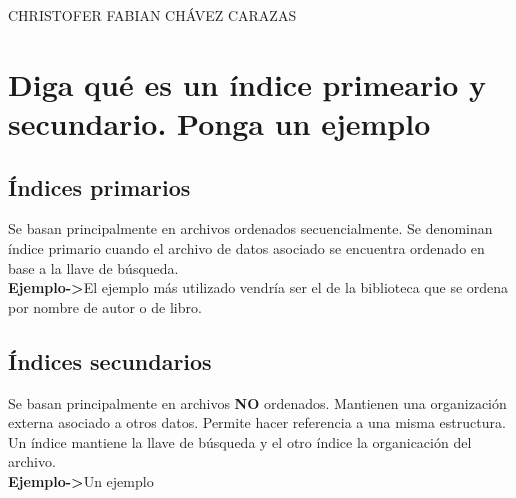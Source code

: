 \documentclass[a4paper,12pt]{article}
\begin{document}
\begin{LARGE}
 CHRISTOFER FABIAN CHÁVEZ CARAZAS
\end{LARGE}

\section{Diga qué es un índice primeario y secundario. Ponga un ejemplo}

  \subsection{Índices primarios}
  
    Se basan principalmente en archivos ordenados secuencialmente.
    Se denominan índice primario cuando el archivo de datos asociado 
    se encuentra ordenado en base a la llave de búsqueda. \\
    
    \textbf{Ejemplo->}El ejemplo más utilizado vendría ser el 
    de la biblioteca que se ordena por nombre de autor o de libro.
    
    
  \subsection{Índices secundarios}
  
    Se basan principalmente en archivos \textbf{NO} ordenados.
    Mantienen una organización externa asociado a otros datos.
    Permite hacer referencia a una misma estructura.
    Un índice mantiene la llave de búsqueda y el otro índice la organicación del archivo. \\
    
    \textbf{Ejemplo->}Un ejemplo 
    

    
    
\end{document}
